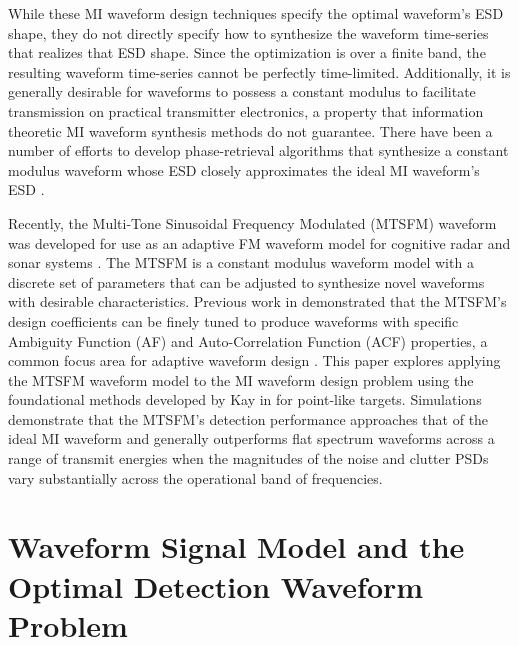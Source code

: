 \documentclass{article}
\begin{document}
While these MI waveform design techniques specify the optimal waveform's ESD shape, they do not directly specify how to synthesize the waveform time-series that realizes that ESD shape.  Since the optimization is over a finite band, the resulting waveform time-series cannot be perfectly time-limited.  Additionally, it is generally desirable for waveforms to possess a constant modulus to facilitate transmission on practical transmitter electronics, a property that information theoretic MI waveform synthesis methods do not guarantee.  There have been a number of efforts to develop phase-retrieval algorithms that synthesize a constant modulus waveform whose ESD closely approximates the ideal MI waveform's ESD \cite{phaseRetrieval, pillai2009reconstruction, Goodman}.  

Recently, the Multi-Tone Sinusoidal Frequency Modulated (MTSFM) waveform was developed for use as an adaptive FM waveform model for cognitive radar and sonar systems \cite{Hague_MTSFM}.  The MTSFM is a constant modulus waveform model with a discrete set of parameters that can be adjusted to synthesize novel waveforms with desirable characteristics.   Previous work in \cite{Hague_MTSFM, Hague_EOA} demonstrated that the MTSFM's design coefficients can be finely tuned to produce waveforms with specific Ambiguity Function (AF) and Auto-Correlation Function (ACF) properties, a common focus area for adaptive waveform design \cite{AubryI, PalomarI, PalomarII, SoltanalianIII}.  This paper explores applying the MTSFM waveform model to the MI waveform design problem using the foundational methods developed by Kay in \cite{Kay2007} for point-like targets.  Simulations demonstrate that the MTSFM's detection performance approaches that of the ideal MI waveform and generally outperforms flat spectrum waveforms across a range of transmit energies when the magnitudes of the noise and clutter PSDs vary substantially across the operational band of frequencies.  

\section{Waveform Signal Model and the Optimal Detection Waveform Problem}
\label{sec:sigModel}
\end{document}

